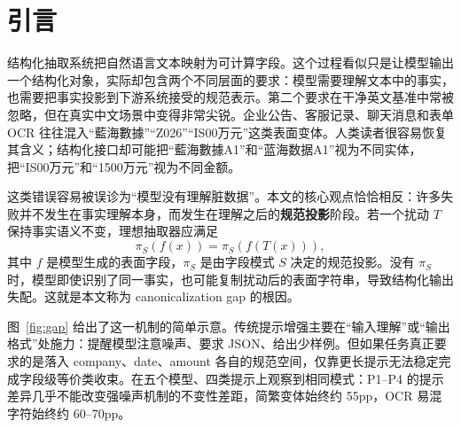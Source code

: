 ﻿\documentclass[UTF8,11pt,a4paper]{ctexart}
\newcommand{\pp}{pp}
\begin{document}
\clearpage
\thispagestyle{empty}
\tableofcontents

\clearpage
\hypersetup{pageanchor=true}
\setcounter{page}{1}

\section{引言}

结构化抽取系统把自然语言文本映射为可计算字段。这个过程看似只是让模型输出一个结构化对象，实际却包含两个不同层面的要求：模型需要理解文本中的事实，也需要把事实投影到下游系统接受的规范表示。第二个要求在干净英文基准中常被忽略，但在真实中文场景中变得非常尖锐。企业公告、客服记录、聊天消息和表单 OCR 往往混入“藍海數據”“Z026”“IS00万元”这类表面变体。人类读者很容易恢复其含义；结构化接口却可能把“藍海數據A1”和“蓝海数据A1”视为不同实体，把“IS00万元”和“1500万元”视为不同金额。

这类错误容易被误诊为“模型没有理解脏数据”。本文的核心观点恰恰相反：许多失败并不发生在事实理解本身，而发生在理解之后的\textbf{规范投影}阶段。若一个扰动 $T$ 保持事实语义不变，理想抽取器应满足
\[
  \pi_S(f(x))=\pi_S(f(T(x))),
\]
其中 $f$ 是模型生成的表面字段，$\pi_S$ 是由字段模式 $S$ 决定的规范投影。没有 $\pi_S$ 时，模型即使识别了同一事实，也可能复制扰动后的表面字符串，导致结构化输出失配。这就是本文称为 canonicalization gap 的根因。

图~\ref{fig:gap} 给出了这一机制的简单示意。传统提示增强主要在“输入理解”或“输出格式”处施力：提醒模型注意噪声、要求 JSON、给出少样例。但如果任务真正要求的是落入 company、date、amount 各自的规范空间，仅靠更长提示无法稳定完成字段级等价类收束。在五个模型、四类提示上观察到相同模式：P1--P4 的提示差异几乎不能改变强噪声机制的不变性差距，简繁变体始终约 55\pp{}，OCR 易混字符始终约 60--70\pp{}。
\end{document}
